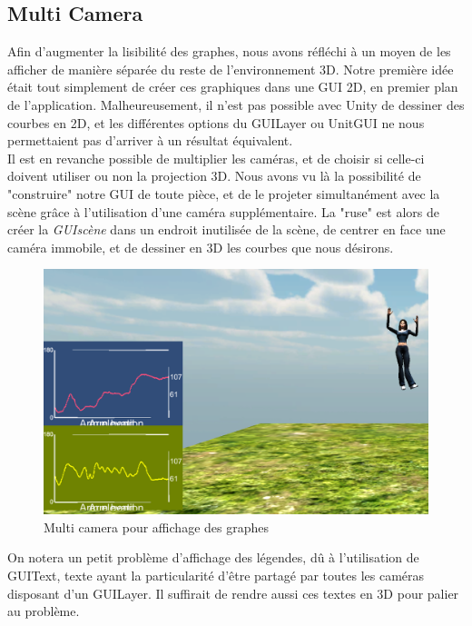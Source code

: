 \subsection{Multi Camera}
Afin d'augmenter la lisibilité des graphes, nous avons réfléchi à un moyen de les afficher de manière séparée du reste de
l'environnement 3D. Notre première idée était tout simplement de créer ces graphiques dans une GUI 2D, en premier
plan de l'application. Malheureusement, il n'est pas possible avec Unity de dessiner des courbes en 2D, et les différentes
options du GUILayer ou UnitGUI ne nous permettaient pas d'arriver à un résultat équivalent.\\
Il est en revanche possible de multiplier les caméras, et de choisir si celle-ci doivent utiliser ou non la projection 3D. Nous 
avons vu là la possibilité de "construire" notre GUI de toute pièce, et de le projeter simultanément avec la scène grâce à
l'utilisation d'une caméra supplémentaire. La "ruse" est alors de créer la  \textit{GUIscène} dans un endroit inutilisée de la 
scène, de centrer en face une caméra immobile, et de dessiner en 3D les courbes que nous désirons.
\begin{figure}
\begin{center}
  \includegraphics[scale=0.6]{images/multicamera.png} \caption{Multi camera pour affichage des graphes}
  \end{center}
\end{figure}
 On notera un petit problème d'affichage des légendes, dû à l'utilisation de GUIText, texte ayant la particularité d'être partagé par toutes les 
caméras disposant d'un GUILayer. Il suffirait de rendre aussi ces textes en 3D pour palier au problème.

